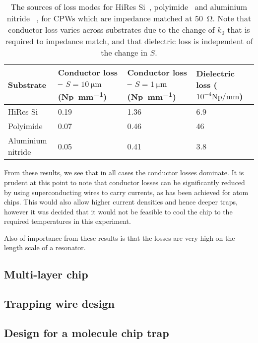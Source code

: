 \begin{table}[h]
  \begin{tabularx}{\textwidth}{lXXX}
    Substrate &
    Conductor loss -- $S=\SI{10}{\micro\meter}$ (\si{\neper \per \milli \meter})
    & Conductor loss -- $S=\SI{1}{\micro\meter}$ (\si{\neper \per \milli \meter})
    & Dielectric loss ($10^{-4}\si{\neper \per \milli \meter}$) \\
    \hline
    HiRes Si & 0.19 & 1.36 & 6.9 \\
    Polyimide & 0.07 & 0.46 & 46 \\
    Aluminium nitride & 0.05 & 0.41 & 3.8
  \end{tabularx}
    \caption{
       The sources
      of loss modes for HiRes Si~\cite{1717770, 517417},
      polyimide~\cite{5734805}  and aluminium nitride~\cite{1666171} , for CPWs which are impedance matched at \SI{50}{\ohm}.
      Note that conductor loss varies across substrates due to the change of
      $k_0$ that is required to impedance match, and that dielectric loss is
      independent of the change in $S$. }
    \label{table:losses}
\end{table}

From these results, we see that in all cases the conductor losses dominate.  It
  is prudent at this point to note that conductor losses can be significantly
  reduced by using superconducting wires to carry currents, as has been achieved
  for atom chips\cite{PhysRevLett.97.200405, Hattermann2017}. This would also
  allow higher current densities and hence deeper traps, however it was decided
  that it would not be feasible to cool the chip to the required temperatures in
  this experiment.

Also of importance from these results is that the losses are very high on the
  length scale of a resonator. 

\subsection{Multi-layer chip}

\subsection{Trapping wire design}

\subsection{Design for a molecule chip trap}
